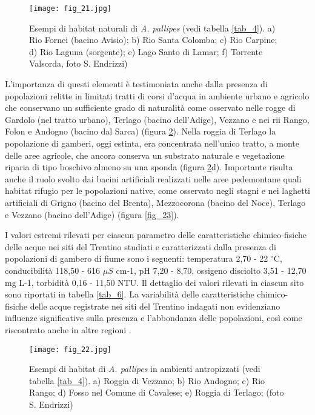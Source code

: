 \documentclass[11pt,a4paper,italian,twoside,openany]{memoir}
\begin{document}
\begin{figure}[!h]
  \centering
  \texttt{[image: fig\_21.jpg]}
  \caption{Esempi di habitat naturali di \emph{A. pallipes} (vedi tabella \ref{tab_4}). a) Rio Fornei (bacino Avisio); b) Rio Santa Colomba; c) Rio Carpine; d) Rio Laguna (sorgente); e) Lago Santo di Lamar; f) Torrente Valsorda, foto S. Endrizzi)}
  \label{fig_21}
\end{figure}

L'importanza di questi elementi è testimoniata anche dalla presenza di popolazioni relitte in limitati tratti di corsi d'acqua in ambiente urbano e agricolo che conservano un sufficiente grado di naturalità come osservato nelle rogge di Gardolo (nel tratto urbano), Terlago (bacino dell'Adige), Vezzano e nei rii Rango, Folon e Andogno (bacino dal Sarca) (figura \ref{fig_22}). Nella roggia di Terlago la popolazione di gamberi, oggi estinta, era concentrata nell'unico tratto, a monte delle aree agricole, che ancora conserva un substrato naturale e vegetazione riparia di tipo boschivo almeno su una sponda (figura \ref{fig_22}d). Importante risulta anche il ruolo svolto dai bacini artificiali realizzati nelle aree pedemontane quali habitat rifugio per le popolazioni native, come osservato negli stagni e nei laghetti artificiali di Grigno (bacino del Brenta), Mezzocorona (bacino del Noce), Terlago e Vezzano (bacino dell'Adige) (figura \ref{fig_23}).

I valori estremi rilevati per ciascun parametro delle caratteristiche chimico-fisiche delle acque nei siti del Trentino studiati e caratterizzati dalla presenza di popolazioni di gambero di fiume sono i seguenti: temperatura 2,70 - 22 $^{\circ}$C, conducibilità 118,50 - 616 $\mu S$ cm-1, pH 7,20 - 8,70, ossigeno disciolto 3,51 - 12,70 mg L-1, torbidità 0,16 - 11,50 NTU. Il dettaglio dei valori rilevati in ciascun sito sono riportati in tabella \ref{tab_6}. La variabilità delle caratteristiche chimico-fisiche delle acque registrate nei siti del Trentino indagati non evidenziano influenze significative sulla presenza e l'abbondanza delle popolazioni, così come riscontrato anche in altre regioni \cite{Nardi 2004} \cite{Favaro 2010}. 

\begin{figure}
  \centering
  \texttt{[image: fig\_22.jpg]}
  \caption{Esempi di habitat di \emph{A. pallipes} in ambienti antropizzati (vedi tabella \ref{tab_4}). a) Roggia di Vezzano; b) Rio Andogno; c) Rio Rango; d) Fosso nel Comune di Cavalese; e) Roggia di Terlago; (foto S. Endrizzi)}
  \label{fig_22}
\end{figure}
\end{document}
